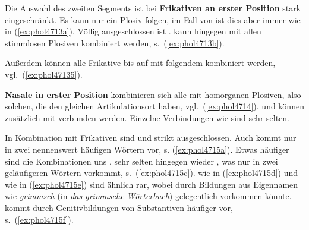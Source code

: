 Die Auswahl des zweiten Segments ist bei \textbf{Frikativen an erster Position} stark eingeschränkt.
Es kann nur ein Plosiv folgen, im Fall von \textipa{[f s \c{c} X]} ist dies aber immer \textipa{[t]} wie in (\ref{ex:phol4713a}).
Völlig ausgeschlossen ist \textipa{[S]}.
\textipa{[K]} kann hingegen mit allen stimmlosen Plosiven kombiniert werden, s.\ (\ref{ex:phol4713b}).

\begin{exe}
  \ex\label{ex:phol4713}
  \begin{xlist}
  \end{xlist}
\end{exe}

Außerdem können alle Frikative bis auf \textipa{[s]} mit folgendem \textipa{[s]} kombiniert werden, vgl.\ (\ref{ex:phol47135}).

\begin{exe}
\end{exe}

\textbf{Nasale in erster Position} kombinieren sich alle mit homorganen Plosiven, also solchen, die den gleichen Artikulationsort haben, vgl.\ (\ref{ex:phol4714}).
\textipa{[m]} und \textipa{[N]} können zusätzlich mit \textipa{[t]} verbunden werden.
Einzelne Verbindungen wie \textipa{[mp]} sind sehr selten.

\begin{exe}
  \ex\label{ex:phol4714}
  \begin{xlist}
  \end{xlist}
\end{exe}

In Kombination mit Frikativen sind \textipa{[nX]} und \textipa{[nK]} strikt ausgeschlossen.
Auch \textipa{[n\c{c}]} kommt nur in zwei nennenswert häufigen Wörtern vor, s. (\ref{ex:phol4715a}).
Etwas häufiger sind die Kombinationen \textipa{[nf]} uns \textipa{[ns]}, sehr selten hingegen wieder \textipa{[nS]}, was nur in zwei geläufigeren Wörtern vorkommt, s.\ (\ref{ex:phol4715c}).
\textipa{[ms]} wie in (\ref{ex:phol4715d}) und \textipa{[mS]} wie in (\ref{ex:phol4715e}) sind ähnlich rar, wobei \textipa{[mS]} durch Bildungen aus Eigennamen wie \textit{grimmsch} (in \textit{das grimmsche Wörterbuch}) gelegentlich vorkommen könnte.
\textipa{[Ns]} kommt durch Genitivbildungen von Substantiven häufiger vor, s.\ (\ref{ex:phol4715f}).

